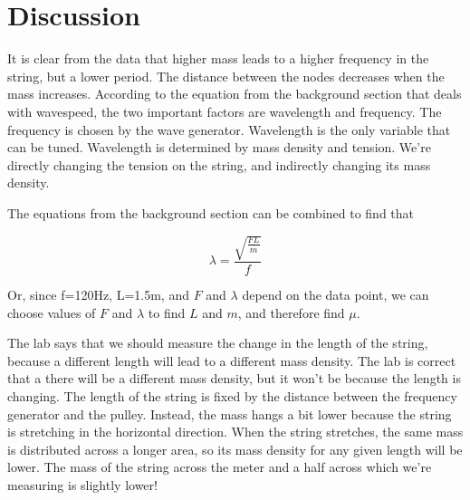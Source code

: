 \documentclass[]{article}
\begin{document}
\section{Discussion}
It is clear from the data that higher mass leads to a higher frequency in the string, but a lower period. The distance between the nodes decreases when the mass increases. According to the equation from the background section that deals with wavespeed, the two important factors are wavelength and frequency. The frequency is chosen by the wave generator. Wavelength is the only variable that can be tuned. Wavelength is determined by mass density and tension. We're directly changing the tension on the string, and indirectly changing its mass density.
\newline

The equations from the background section can be combined to find that

\begin{equation}
\lambda=\frac{\sqrt{\frac{FL}{m}}}{f}
\end{equation}

Or, since f=120Hz, L=1.5m, and $F$ and $\lambda$ depend on the data point, we can choose values of $F$ and $\lambda$ to find $L$ and $m$, and therefore find $\mu$.
\newline

The lab says that we should measure the change in the length of the string, because a different length will lead to a different mass density. The lab is correct that a there will be a different mass density, but it won't be because the length is changing. The length of the string is fixed by the distance between the frequency generator and the pulley. Instead, the mass hangs a bit lower because the string is stretching in the horizontal direction. When the string stretches, the same mass is distributed across a longer area, so its mass density for any given length will be lower. The mass of the string across the meter and a half across which we're measuring is slightly lower!
\end{document}

